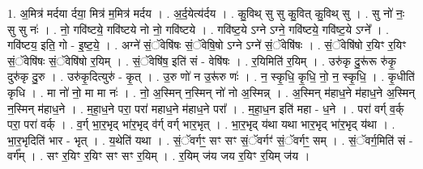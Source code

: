 \documentclass[17pt]{extarticle}
\begin{document}
1. अ॒मित्र॑ मर्दया र्दया॒ मित्र॑ म॒मित्र॑ मर्दय । . अ॒र्द॒येत्य॑र्दय । . कु॒विथ् सु सु कु॒वित् कु॒विथ् सु । . सु नो॑ नः॒ सु सु नः॑ । . नो॒ गवि॑ष्टये॒ गवि॑ष्टये नो नो॒ गवि॑ष्टये । . गवि॑ष्ट॒ये ऽग्ने ऽग्ने॒ गवि॑ष्टये॒ गवि॑ष्ट॒ये ऽग्ने᳚ । . गवि॑ष्टय॒ इति॒ गो - इ॒ष्ट॒ये॒ । . अग्ने॑ सं॒ॅवेषि॑षः सं॒ॅवेषि॒षो ऽग्ने ऽग्ने॑ सं॒ॅवेषि॑षः । . सं॒ॅवेषि॑षो र॒यिꣳ र॒यिꣳ सं॒ॅवेषि॑षः सं॒ॅवेषि॑षो र॒यिम् । . सं॒ॅवेषि॑ष॒ इति॑ सं - वेषि॑षः । . र॒यिमिति॑ र॒यिम् । . उरु॑कृ दु॒रू॑रू रु॑कृ॒ दुरु॑कृ दु॒रु । . उरु॑कृ॒दित्युरु॑ - कृ॒त् । . उ॒रु णो॑ न उ॒रू॑रु णः॑ । . न॒ स्कृ॒धि॒ कृ॒धि॒ नो॒ न॒ स्कृ॒धि॒ । . कृ॒धीति॑ कृधि । . मा नो॑ नो॒ मा मा नः॑ । . नो॒ अ॒स्मिन् न॒स्मिन् नो॑ नो अ॒स्मिन्न् । . अ॒स्मिन् म॑हाध॒ने म॑हाध॒ने अ॒स्मिन् न॒स्मिन् म॑हाध॒ने । . म॒हा॒ध॒ने परा॒ परा॑ महाध॒ने म॑हाध॒ने परा᳚ । . म॒हा॒ध॒न इति॑ महा - ध॒ने । . परा॑ वर्ग् व॒र्क् परा॒ परा॑ वर्क् । . व॒र्ग् भा॒र॒भृद् भा॑र॒भृद् व॑र्ग् वर्ग् भार॒भृत् । . भा॒र॒भृद् य॑था यथा भार॒भृद् भा॑र॒भृद् य॑था । . भा॒र॒भृदिति॑ भार - भृत् । . य॒थेति॑ यथा । . सं॒ॅवर्गꣳ॒॒ सꣳ सꣳ सं॒ॅवर्गꣳ॑ सं॒ॅवर्गꣳ॒॒ सम् । . सं॒ॅवर्ग॒मिति॑ सं - वर्ग᳚म् । . सꣳ र॒यिꣳ र॒यिꣳ सꣳ सꣳ र॒यिम् । . र॒यिम् ज॑य जय र॒यिꣳ र॒यिम् ज॑य । \newline
\end{document}
